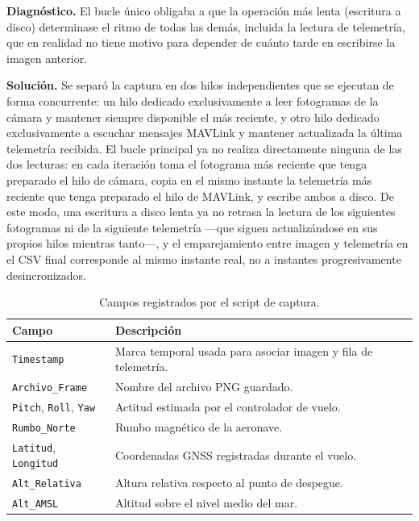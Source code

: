 \textbf{Diagnóstico.} El bucle único obligaba a que la operación más lenta (escritura a disco) determinase el ritmo de todas las demás, incluida la lectura de telemetría, que en realidad no tiene motivo para depender de cuánto tarde en escribirse la imagen anterior.

\textbf{Solución.} Se separó la captura en dos hilos independientes que se ejecutan de forma concurrente: un hilo dedicado exclusivamente a leer fotogramas de la cámara y mantener siempre disponible el más reciente, y otro hilo dedicado exclusivamente a escuchar mensajes MAVLink y mantener actualizada la última telemetría recibida. El bucle principal ya no realiza directamente ninguna de las dos lecturas: en cada iteración toma el fotograma más reciente que tenga preparado el hilo de cámara, copia en el mismo instante la telemetría más reciente que tenga preparado el hilo de MAVLink, y escribe ambos a disco. De este modo, una escritura a disco lenta ya no retrasa la lectura de los siguientes fotogramas ni de la siguiente telemetría —que siguen actualizándose en sus propios hilos mientras tanto—, y el emparejamiento entre imagen y telemetría en el CSV final corresponde al mismo instante real, no a instantes progresivamente desincronizados.

\begin{table}[htbp]
\centering
\caption{Campos registrados por el script de captura.}
\label{tab:campos-telemetria}
\begin{tabularx}{\textwidth}{p{}X}
\toprule
\textbf{Campo} & \textbf{Descripción} \\
\midrule
\texttt{Timestamp} & Marca temporal usada para asociar imagen y fila de telemetría. \\
\texttt{Archivo\_Frame} & Nombre del archivo PNG guardado. \\
\texttt{Pitch}, \texttt{Roll}, \texttt{Yaw} & Actitud estimada por el controlador de vuelo. \\
\texttt{Rumbo\_Norte} & Rumbo magnético de la aeronave. \\
\texttt{Latitud}, \texttt{Longitud} & Coordenadas GNSS registradas durante el vuelo. \\
\texttt{Alt\_Relativa} & Altura relativa respecto al punto de despegue. \\
\texttt{Alt\_AMSL} & Altitud sobre el nivel medio del mar. \\
\bottomrule
\end{tabularx}
\end{table}

